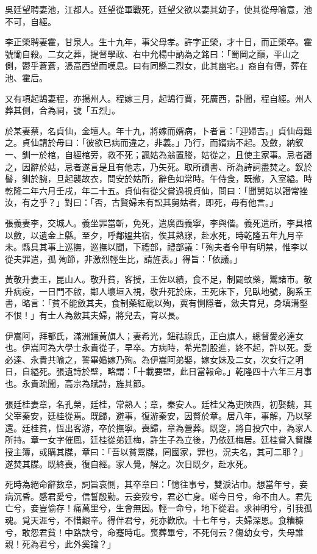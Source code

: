 \begin{pinyinscope}
吳廷望聘妻池，江都人。廷望從軍戰死，廷望父欲以妻其幼子，使其從母喻意，池不可，自經。

李正榮聘妻霍，甘泉人。生十九年，事父母孝。許字正榮，才十日，而正榮卒。霍號慟自殺。二女之葬，提督學政、右中允楊中訥為之銘曰：「蜀岡之巔，平山之側，鬱乎蒼蒼，憑高西望而嘆息。曰有同縣二烈女，此其幽宅。」裔自有傳，葬在池、霍后。

又有項起鵠妻程，亦揚州人。程嫁三月，起鵠行賈，死廣西，訃聞，程自經。州人葬其側，合為祠，號「五烈」。

於某妻蔡，名貞仙，金壇人。年十九，將嫁而婿病，卜者言：「迎婦吉。」貞仙母難之。貞仙請於母曰：「彼欲已病而違之，非義。」乃行，而婿病不起。及斂，納釵一、釧一於棺，自經棺旁，救不死；諷姑為翁置媵，姑從之，且使主家事。忌者譖之，因辭於姑，忌者遂言是且有他志，乃矢死。取所讀書、所為詩詞盡焚之。釵於髻，釧於腕，旦起襲故衣，問安於姑所，辭色如常時。午侍食，既撤，入室縊。時乾隆二年六月壬戌，年二十五。貞仙有從父嘗過視貞仙，問曰：「聞舅姑以譖常挫汝，有之乎？」對曰：「否，古賢婦未有訟其舅姑者，即死，毋有他言。」

張義妻李，交城人。義坐罪當斬，免死，遣廣西義寧，李與偕。義死遣所，李具棺以斂，以遺金上縣。至夕，呼鄰媼共宿，俟其熟寐，赴水死，時乾隆五年九月辛未。縣具其事上巡撫，巡撫以聞，下禮部，禮部議：「殉夫者令甲有明禁，惟李以從夫罪遣，孤殉節，非激烈輕生比，請旌表。」得旨：「依議。」

黃敬升妻王，昆山人。敬升貧，客授，王佐以績，食不足，制闢蚊藥，鬻諸市。敬升病疫，一日門不啟，鄰人壞垣入視，敬升死於床，王死床下，兒臥地號，胸系王書，略言：「貧不能斂其夫，食制藥紅砒以殉，冀有惻隱者，斂夫育兒，身填溝壑不恨！」有士人為斂其夫婦，將兒去，育以長。

伊嵩阿，拜都氏，滿洲鑲黃旗人；妻希光，鈕祜祿氏，正白旗人，總督愛必達女也。伊嵩阿為大學士永貴從子，早卒。方病時，希光割股進，終不起，許以死。愛必達、永貴共喻之，誓畢婚嫁乃殉。為伊嵩阿弟娶，嫁女妹及二女，次女行之明日，自縊死。張遺詩於壁，略謂：「十載要盟，此日當報命。」乾隆四十六年三月事也。永貴疏聞，高宗為賦詩，旌其節。

張廷桂妻章，名孔榮，廷桂，常熟人；章，秦安人。廷桂父為吏陜西，初娶魏，其父宰秦安，廷桂從焉。既歸，避事，復游秦安，因贅於章。居八年，事解，乃以孥還。廷桂貧，恆出客游，卒於撫寧。喪歸，章為營葬。既窆，將自投穴中，為家人所持。章一女字催鳳，廷桂從弟廷梅，許生子為立後，乃依廷梅居。廷桂嘗入貲牒授主簿，或購其牒，章曰：「吾以貧鬻牒，罔國家，罪也，況夫名，其可二耶？」遂焚其牒。既終喪，復自經。家人覺，解之。次日既夕，赴水死。

死時為絕命辭數章，詞旨哀惻，其卒章曰：「憶往事兮，雙淚沾巾。想當年兮，妾病沉昏。感君愛兮，信誓殷勤。云妾歿兮，君必亡身。嗟今日兮，命不由人。君先亡兮，妾豈偷存！痛萬里兮，生會無因。輕一命兮，地下從君。求神明兮，引我孤魂。覓天涯兮，不惜艱辛。得伴君兮，死亦歡欣。十七年兮，夫婦深恩。食糟糠兮，敢怨君貧！中路訣兮，命蹇時屯。喪葬畢兮，不死何云？傷幼女兮，失母誰親！死為君兮，此外奚論？」


\end{pinyinscope}
